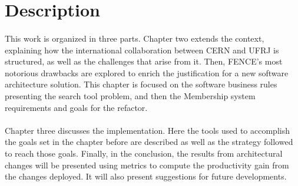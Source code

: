 \section{Description}

\paragraph{} This work is organized in three parts. Chapter two extends the context, explaining how the international collaboration between CERN and UFRJ is structured, as well as the challenges that arise from it. Then, FENCE's most notorious drawbacks are explored to enrich the justification for a new software architecture solution. This chapter is focused on the software business rules presenting the search tool problem, and then the Membership system requirements and goals for the refactor.
\paragraph{} Chapter three discusses the implementation. Here the tools used to accomplish the goals set in the chapter before are described as well as the strategy followed to reach those goals. Finally, in the conclusion, the results from architectural changes will be presented using metrics to compute the productivity gain from the changes deployed. It will also present suggestions for future developments. 
